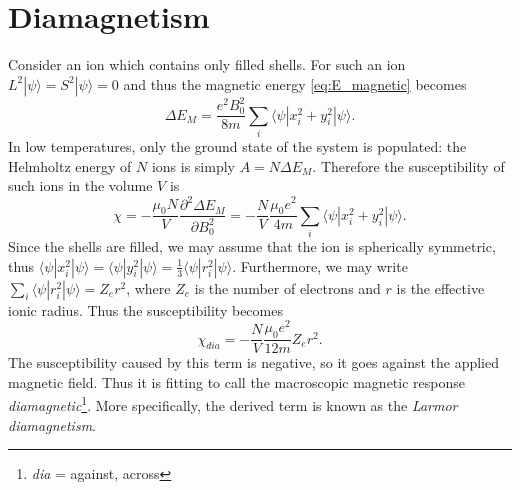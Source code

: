 \section{Diamagnetism}
Consider an ion which contains only filled shells. For such an ion $L^2|\psi\rangle = S^2|\psi\rangle = 0$ and thus the magnetic energy \eqref{eq:E_magnetic} becomes
\begin{equation}
\Delta E_M = \frac{e^2 B_0^2}{8 m}\sum_i \langle \psi | x_i^2 + y_i^2 | \psi \rangle.
\end{equation}
In low temperatures, only the ground state of the system is populated: the Helmholtz energy of $N$ ions is simply $A = N\Delta E_M$. Therefore the susceptibility of such ions in the volume $V$ is
\begin{equation}
\chi = -\frac{\mu_0 N}{V} \frac{\partial^2 \Delta E_M}{\partial B_0^2}
= -\frac{N}{V} \frac{\mu_0 e^2}{4 m}\sum_i \langle \psi | x_i^2 + y_i^2 | \psi \rangle.
\end{equation}
Since the shells are filled, we may assume that the ion is spherically symmetric, thus $\langle \psi | x_i^2| \psi \rangle = \langle \psi | y_i^2 | \psi \rangle = \frac{1}{3} \langle \psi | r_i^2| \psi \rangle $. Furthermore, we may write $\sum_i \langle \psi | r_i^2| \psi \rangle = Z_{e} r^2$, where $Z_{e}$ is the number of electrons and $r$ is the effective ionic radius. Thus the susceptibility becomes
\begin{equation}
\chi_{dia} =  -\frac{N}{V} \frac{\mu_0  e^2}{12 m} Z_{e} r^2.
\end{equation}
The susceptibility caused by this term is negative, so it goes against the applied magnetic field. Thus it is fitting to call the macroscopic magnetic response \emph{diamagnetic}\footnote{\emph{dia} = against, across}. More specifically, the derived term is known as the \emph{Larmor diamagnetism}.


